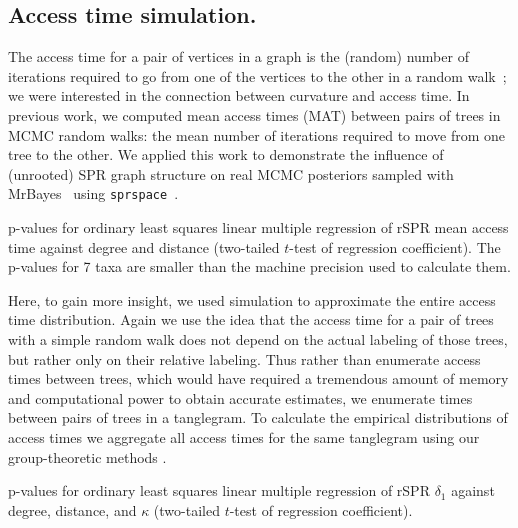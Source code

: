 \documentclass[]{elsarticle}
\let\MYoriglatexcaption\caption
\renewcommand{\caption}[2][\relax]{\MYoriglatexcaption[#2]{#2}}
\begin{document}
\subsection{Access time simulation.}
The access time for a pair of vertices in a graph is the (random) number of iterations required to go from one of the vertices to the other in a random walk~\citep{lovasz1993random}; we were interested in the connection between curvature and access time.
In previous work, we computed mean access times (MAT) between pairs of trees in  MCMC random walks: the mean number of iterations required to move from one tree to the other.
We applied this work to demonstrate the influence of (unrooted) SPR graph structure on real MCMC posteriors sampled with MrBayes~\citep{Whidden2015-yi} using \texttt{sprspace}~\citep{sprspace}.

\begin{table}
\centering
\caption{p-values for ordinary least squares linear multiple regression of rSPR mean access time against degree and distance (two-tailed $t$-test of regression coefficient). The p-values for 7 taxa are smaller than the machine precision used to calculate them.}
\label{tab:regressionMAT}
\end{table}

Here, to gain more insight, we used simulation to approximate the entire access time distribution.
Again we use the idea that the access time for a pair of trees with a simple random walk does not depend on the actual labeling of those trees, but rather only on their relative labeling.
Thus rather than enumerate access times between trees, which would have required a tremendous amount of memory and computational power to obtain accurate estimates, we enumerate times between pairs of trees in a tanglegram.
To calculate the empirical distributions of access times we aggregate all access times for the same tanglegram using our group-theoretic methods \citep{tangle}.

\begin{table}
\centering
\caption{p-values for ordinary least squares linear multiple regression of rSPR $\delta_1$ against degree, distance, and $\kappa$ (two-tailed $t$-test of regression coefficient).}
\label{tab:regressionDelta}
\vspace{2em}
\end{table}
\end{document}
